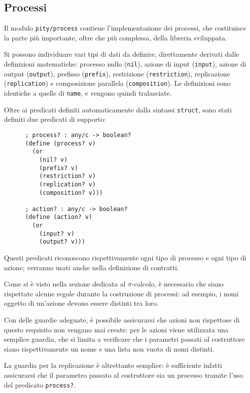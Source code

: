 \subsection{Processi}

Il modulo \lstinline{pity/process} contiene l'implementazione dei processi,
che costituisce la parte pi\`u importante, oltre che pi\`u complessa, della
libreria sviluppata.

Si possono individuare vari tipi di dati da definire, direttamente derivati
dalle definizioni matematiche: processo nullo (\lstinline{nil}), azione di
input (\lstinline{input}), azione di output (\lstinline{output}), prefisso
(\lstinline{prefix}), restrizione (\lstinline{restriction}), replicazione
(\lstinline{replication}) e composizione parallela (\lstinline{composition}).
Le definizioni sono identiche a quelle di \lstinline{name}, e vengono quindi
tralasciate.

Oltre ai predicati definiti automaticamente dalla sintassi
\lstinline{struct}, sono stati definiti due predicati di supporto:

\begin{lstlisting}
      ; process? : any/c -> boolean?
      (define (process? v)
        (or
          (nil? v)
          (prefix? v)
          (restriction? v)
          (replication? v)
          (composition? v)))

      ; action? : any/c -> boolean?
      (define (action? v)
        (or
          (input? v)
          (output? v)))

\end{lstlisting}

Questi predicati riconoscono rispettivamente ogni tipo di processo e ogni
tipo di azione; verranno usati anche nella definizione di contratti.

Come si \`e visto nella sezione dedicata al $\pi$-calcolo, \`e necessario
che siano rispettate alcune regole durante la costruzione di processi: ad
esempio, i nomi oggetto di un'azione devono essere distinti tra loro.

Con delle guardie adeguate, \`e possibile assicurarsi che azioni non
rispettose di questo requisito non vengano mai create: per le azioni viene
utilizzata una semplice guardia, che si limita a verificare che i parametri
passati al costruttore siano rispettivamente un nome e una lista non vuota
di nomi distinti.

La guardia per la replicazione \`e altrettanto semplice: \`e sufficiente
infatti assicurarsi che il parametro passato al costruttore sia un processo
tramite l'uso del predicato \lstinline{process?}.

